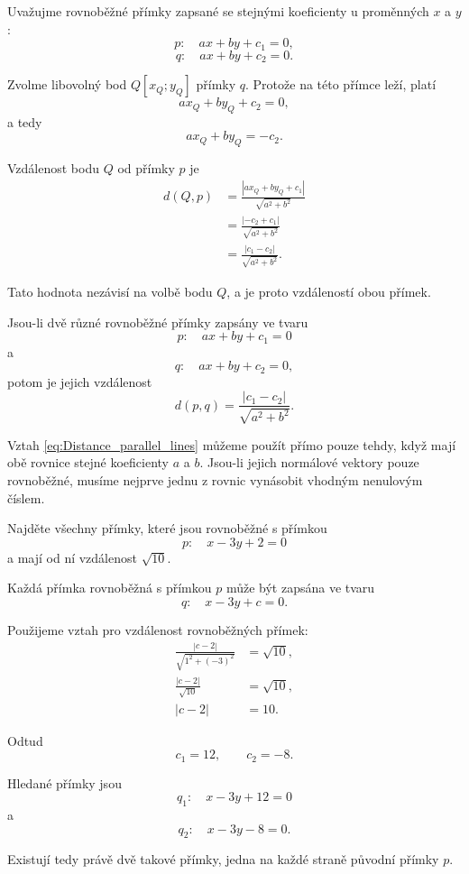 Uvažujme rovnoběžné přímky zapsané se stejnými koeficienty u
proměnných $x$ a $y$:
\[
    p:\quad ax+by+c_1=0,
\]
\[
    q:\quad ax+by+c_2=0.
\]

Zvolme libovolný bod $Q[x_Q;y_Q]$ přímky $q$. Protože na této přímce
leží, platí
\[
    ax_Q+by_Q+c_2=0,
\]
a tedy
\[
    ax_Q+by_Q=-c_2.
\]

Vzdálenost bodu $Q$ od přímky $p$ je
\begin{align*}
    d(Q,p)
    &=
    \frac{|ax_Q+by_Q+c_1|}{\sqrt{a^2+b^2}}\\
    &=
    \frac{|-c_2+c_1|}{\sqrt{a^2+b^2}}\\
    &=
    \frac{|c_1-c_2|}{\sqrt{a^2+b^2}}.
\end{align*}

Tato hodnota nezávisí na volbě bodu $Q$, a je proto vzdáleností obou
přímek.

Jsou-li dvě různé rovnoběžné přímky zapsány ve tvaru
\[
    p:\quad ax+by+c_1=0
\]
a
\[
    q:\quad ax+by+c_2=0,
\]
potom je jejich vzdálenost
\begin{equation}\label{eq:Distance_parallel_lines}
    d(p,q)
    =
    \frac{|c_1-c_2|}{\sqrt{a^2+b^2}}.
\end{equation}

\begin{remark}\label{rem:Same_normal_parallel_distance}
    Vztah \eqref{eq:Distance_parallel_lines} můžeme použít přímo pouze
    tehdy, když mají obě rovnice stejné koeficienty $a$ a $b$.
    Jsou-li jejich normálové vektory pouze rovnoběžné, musíme nejprve
    jednu z rovnic vynásobit vhodným nenulovým číslem.
\end{remark}

\begin{example}\label{exa:Parallel_lines_given_distance}
    Najděte všechny přímky, které jsou rovnoběžné s přímkou
    \[
        p:\quad x-3y+2=0
    \]
    a mají od ní vzdálenost $\sqrt{10}$.

    Každá přímka rovnoběžná s přímkou $p$ může být zapsána ve tvaru
    \[
        q:\quad x-3y+c=0.
    \]

    Použijeme vztah pro vzdálenost rovnoběžných přímek:
    \begin{align*}
        \frac{|c-2|}{\sqrt{1^2+(-3)^2}}
        &=
        \sqrt{10},\\
        \frac{|c-2|}{\sqrt{10}}
        &=
        \sqrt{10},\\
        |c-2|&=10.
    \end{align*}

    Odtud
    \[
        c_1=12,
        \qquad
        c_2=-8.
    \]

    Hledané přímky jsou
    \[
        q_1:\quad x-3y+12=0
    \]
    a
    \[
        q_2:\quad x-3y-8=0.
    \]

    Existují tedy právě dvě takové přímky, jedna na každé straně
    původní přímky $p$.
\end{example}

